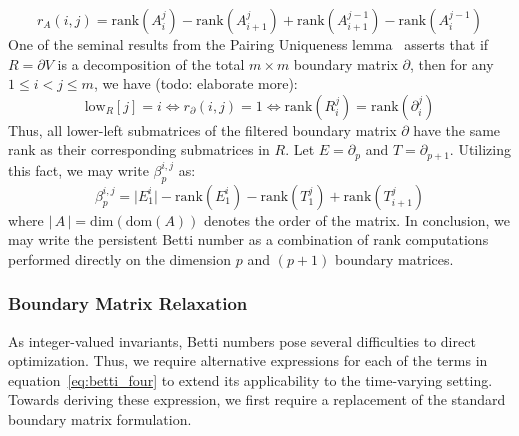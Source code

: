 \documentclass[10pt]{article}
\begin{document}
\begin{equation}
	r_A(i,j) = \mathrm{rank}(A_i^j) - \mathrm{rank}(A_{i+1}^j) + \mathrm{rank}(A_{i+1}^{j-1}) - \mathrm{rank}(A_i^{j-1})
\end{equation}
One of the seminal results from the Pairing Uniqueness lemma~\cite{} asserts that if $R = \partial V$ is a decomposition of the total $m \times m$ boundary matrix $\partial$, then for any $1 \leq i < j \leq m$, we have (todo: elaborate more): 
$$ \mathrm{low}_R[j] = i \iff r_\partial(i,j) = 1 \iff \mathrm{rank}(R_i^j) = \mathrm{rank}(\partial_i^j)$$
Thus, all lower-left submatrices of the filtered boundary matrix $\partial$ have the same rank as their corresponding submatrices in $R$. 
Let $E = \partial_p$ and $T = \partial_{p+1}$. Utilizing this fact, we may write $\beta_p^{i,j}$ as: 
\begin{equation}\label{eq:betti_four}
	\beta_p^{i,j} = \lvert E_1^i \rvert - \mathrm{rank}(E_1^i) - \mathrm{rank}(T_1^j) + \mathrm{rank}(T_{i+1}^j)
\end{equation}
where $\lvert \, A \, \rvert = \mathrm{dim}(\mathrm{dom}(A))$ denotes the order of the matrix. In conclusion, we may write the persistent Betti number as a combination of rank computations performed directly on the dimension $p$ and $(p+1)$ boundary matrices. 


\subsubsection*{Boundary Matrix Relaxation}
As integer-valued invariants, Betti numbers pose several difficulties to direct optimization. Thus, we require alternative expressions for each of the terms in equation~\eqref{eq:betti_four} to extend its applicability to the time-varying setting. Towards deriving these expression, we first require a replacement of the standard boundary matrix formulation. 
\end{document}
